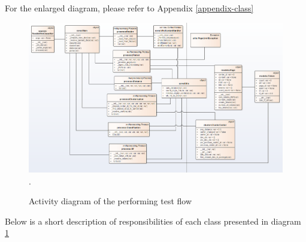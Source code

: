 For the enlarged diagram, please refer to Appendix \ref{appendix-class}

\begin{figure}[H]
	\begin{center}
		\includegraphics[width=1.0\linewidth]{images/diagrams/class.png}.
		\caption{Activity diagram of the performing test flow}
		\label{design-class-diagram}
	\end{center}
\end{figure}

Below is a short description of responsibilities of each class presented in diagram \ref{design-class-diagram}

